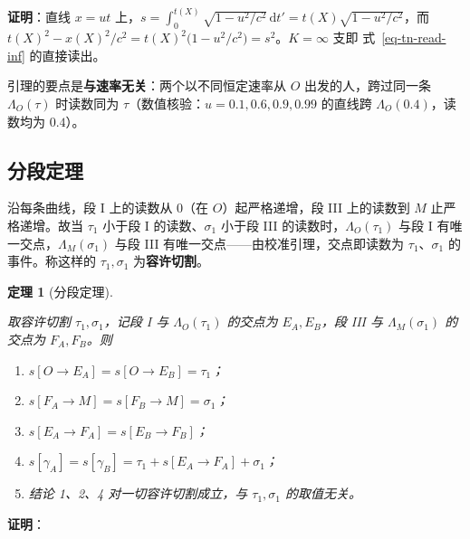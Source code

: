 \documentclass[
  chinese,
  a4paper,
  UTF8,
  12pt,
  oneside,
  openany]{ctexbook}
\providecommand{\tightlist}{%
  \setlength{\itemsep}{0pt}\setlength{\parskip}{0pt}}
\theoremstyle{plain}
\newtheorem{theorem}{定理}[chapter]
\theoremstyle{plain}
\theoremstyle{plain}
\theoremstyle{definition}
\theoremstyle{plain}
\theoremstyle{plain}
\theoremstyle{remark}
\begin{document}
\textbf{证明}：直线 \(x=ut\)
上，\(s=\displaystyle\int_{0}^{t(X)}\sqrt{1-u^{2}/c^{2}}\,\mathrm{d}t'=t(X)\sqrt{1-u^{2}/c^{2}}\)，而
\(t(X)^{2}-x(X)^{2}/c^{2}=t(X)^{2}\bigl(1-u^{2}/c^{2}\bigr)=s^{2}\)。\(K=\infty\)
支即 式~\ref{eq-tn-read-inf} 的直接读出。

引理的要点是\textbf{与速率无关}：两个以不同恒定速率从 \(O\)
出发的人，跨过同一条 \(\Lambda_O(\tau)\) 时读数同为
\(\tau\)（数值核验：\(u=0.1,0.6,0.9,0.99\) 的直线跨
\(\Lambda_O(0.4)\)，读数均为 \(0.4\)）。

\subsection{分段定理}\label{ux5206ux6bb5ux5b9aux7406}

沿每条曲线，段 I 上的读数从 \(0\)（在 \(O\)）起严格递增，段 III
上的读数到 \(M\) 止严格递增。故当 \(\tau_1\) 小于段 I
的读数、\(\sigma_1\) 小于段 III 的读数时，\(\Lambda_O(\tau_1)\) 与段 I
有唯一交点，\(\Lambda_M(\sigma_1)\) 与段 III
有唯一交点------由校准引理，交点即读数为 \(\tau_1\)、\(\sigma_1\)
的事件。称这样的 \(\tau_1,\sigma_1\) 为\textbf{容许切割}。

\begin{theorem}[分段定理]\protect\hypertarget{thm-tn-cut}{}\label{thm-tn-cut}

取容许切割 \(\tau_1,\sigma_1\)，记段 I 与 \(\Lambda_O(\tau_1)\) 的交点为
\(E_A,E_B\)，段 III 与 \(\Lambda_M(\sigma_1)\) 的交点为 \(F_A,F_B\)。则

\begin{enumerate}
\def\labelenumi{\arabic{enumi}.}
\tightlist
\item
  \(s[O\to E_A]=s[O\to E_B]=\tau_1\)；
\item
  \(s[F_A\to M]=s[F_B\to M]=\sigma_1\)；
\item
  \(s[E_A\to F_A]=s[E_B\to F_B]\)；
\item
  \(s[\gamma_A]=s[\gamma_B]=\tau_1+s[E_A\to F_A]+\sigma_1\)；
\item
  结论 1、2、4 对一切容许切割成立，与 \(\tau_1,\sigma_1\) 的取值无关。
\end{enumerate}

\end{theorem}

\textbf{证明}：
\end{document}
